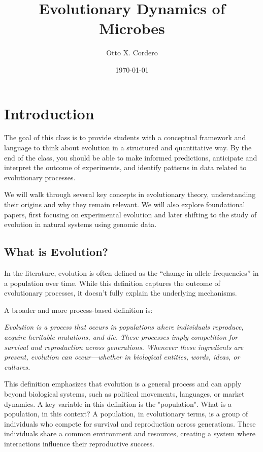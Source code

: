\documentclass[10pt,a4paper]{scrbook}
\title{Evolutionary Dynamics of Microbes}
\author{Otto X. Cordero}
\date{\today}
\begin{document}
\frontmatter
\let\cleardoublepage\clearpage
\maketitle
\tableofcontents

\mainmatter

\chapter{Introduction}

The goal of this class is to provide students with a conceptual framework and language to think about evolution in a structured and quantitative way. By the end of the class, you should be able to make informed predictions, anticipate and interpret the outcome of experiments, and identify patterns in data related to evolutionary processes.

We will walk through several key concepts in evolutionary theory, understanding their origins and why they remain relevant. We will also explore foundational papers, first focusing on experimental evolution and later shifting to the study of evolution in natural systems using genomic data.

\section{What is Evolution?}
In the literature, evolution is often defined as the “change in allele frequencies” in a population over time. While this definition captures the outcome of evolutionary processes, it doesn’t fully explain the underlying mechanisms.

A broader and more process-based definition is: 

\emph{Evolution is a process that occurs in populations where individuals reproduce, acquire heritable mutations, and die. These processes imply competition for survival and reproduction across generations. Whenever these ingredients are present, evolution can occur—whether in biological entities, words, ideas, or cultures.}

This definition emphasizes that evolution is a general process and can apply beyond biological systems, such as political movements, languages, or market dynamics. A key variable in this definition is the "population". What is a population, in this context? A population, in evolutionary terms, is a group of individuals who compete for survival and reproduction across generations. These individuals share a common environment and resources, creating a system where interactions influence their reproductive success. 
\end{document}
